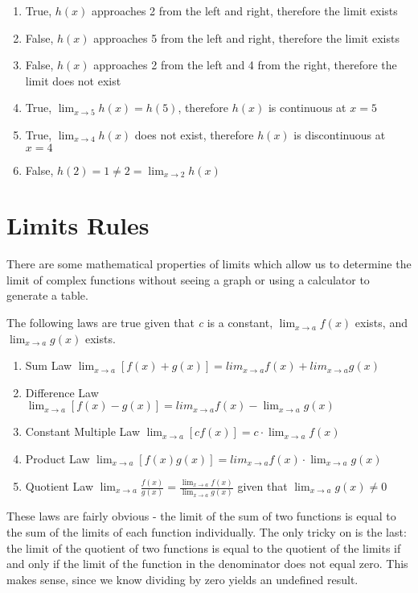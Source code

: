 \begin{Answer}[ref=limits6]
	\begin{enumerate}
	\item True, $h(x)$ approaches 2 from the left and right, therefore the limit 
	exists
	\item False, $h(x)$ approaches 5 from the left and right, therefore the limit 
	exists
	\item False, $h(x)$ approaches 2 from the left and 4 from the right, therefore 
	the limit does not exist
	\item True, $\lim_{x \to 5}h(x) = h(5)$, therefore $h(x)$ is continuous at $x=5$
	\item True, $\lim_{x \to 4}h(x)$ does not exist, therefore $h(x)$ is 
	discontinuous at $x=4$
	\item False, $h(2) = 1 \neq 2 = \lim_{x \to 2}h(x)$
	\end{enumerate}
\end{Answer}

\section{Limits Rules}
There are some mathematical properties of limits which allow us to determine the 
limit of complex functions without seeing a graph or using a calculator to generate 
a table. 

The following laws are true given that \textit{c} is a constant, $\lim_{x\to a} 
f(x) $ exists, and $\lim_{x\to a} g(x) $ exists.

\begin{enumerate}
    \item Sum Law $\lim_{x\to a} \left[f(x) + g(x) \right] = lim_{x\to a} f(x) 
    + lim_{x\to a} g(x)$
    \item Difference Law $\lim_{x\to a} \left[f(x) - g(x) \right] = 
    lim_{x\to a} f(x) - \lim_{x\to a} g(x)$
    \item Constant Multiple Law $\lim_{x\to a} \left[\textit{c}f(x) \right] = 
    \textit{c} \cdot \lim_{x\to a} f(x) $
    \item Product Law $\lim_{x\to a} \left[f(x)g(x) \right] = lim_{x\to a}f(x) 
    \cdot \lim_{x\to a} g(x)$
    \item Quotient Law $\lim_{x\to a} \frac{f(x)}{g(x)} = \frac{\lim_{x\to a} 
    f(x)}{\lim_{x\to a} g(x)}$ given that $\lim_{x\to a} g(x) \neq 0$
\end{enumerate}
These laws are fairly obvious - the limit of the sum of two functions is equal to 
the sum of the limits of each function individually. The only tricky on is the 
last: the limit of the quotient of two functions is equal to the quotient of the 
limits if and only if the limit of the function in the denominator does not equal 
zero. This makes sense, since we know dividing by zero yields an undefined result. 

